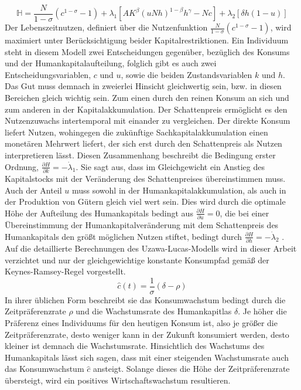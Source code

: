 \begin{equation}
\mathbb{H}=\frac{N}{1-\sigma}(c^{1-\sigma}-1)+\lambda_1[AK^\beta(uNh)^{1-\beta}h^\gamma-Nc]+\lambda_2[\delta h(1-u)]
\end{equation}
Der Lebenszeitnutzen, definiert {\"u}ber die Nutzenfunktion $\frac{N}{1-\sigma}(c^{1-\sigma}-1)$, wird maximiert unter Ber{\"u}cksichtigung beider Kapitalrestriktionen. \newline Ein Individuum steht in diesem Modell zwei Entscheidungen gegen{\"u}ber, bez{\"u}glich des Konsums und der Humankapitalaufteilung, folglich gibt es auch zwei Entscheidungsvariablen, $c$ und $u$, sowie die beiden Zustandsvariablen $k$ und $h$. \newline Das Gut muss demnach in zweierlei Hinsicht gleichwertig sein, bzw. in diesen Bereichen gleich wichtig sein. Zum einen durch den reinen Konsum an sich und zum anderen in der Kapitalakkumulation. Der Schattenpreis erm{\"o}glicht es den Nutzenzuwachs intertemporal mit einander zu vergleichen. Der direkte Konsum liefert Nutzen, wohingegen die zuk{\"u}nftige Sachkapitalakkumulation einen monet{\"a}ren Mehrwert liefert, der sich erst durch den Schattenpreis als Nutzen interpretieren l{\"a}sst.  Diesen Zusammenhang beschreibt die Bedingung erster Ordnung, $\frac{\partial H}{\partial k}=-\dot{\lambda}_1$. Sie sagt aus, dass im Gleichgewicht ein Anstieg des Kapitalstocks mit der Ver{\"a}nderung des Schattenpreises {\"u}bereinstimmen muss. \newline 
Auch der Anteil $u$ muss sowohl in der Humankapitalakkumulation, als auch in der Produktion von G{\"u}tern gleich viel wert sein. Dies wird durch die optimale H{\"o}he der Aufteilung des Humankapitals bedingt aus $\frac{\partial H}{\partial u}=0$, die bei einer {\"U}bereinstimmung der Humankapitalver{\"a}nderung mit dem Schattenpreis des Humankapitals den gr{\"o}{\ss}t m{\"o}glichen Nutzen stiftet, bedingt durch $\frac{\partial H}{\partial h}=-\dot{\lambda}_2$ \cite[S.~20--21]{Lucas.1988}.\\
Auf die detaillierte  Berechnungen des Uzawa-Lucas-Modells wird in dieser Arbeit verzichtet und nur der gleichgewichtige konstante Konsumpfad gem{\"a}{\ss} der Keynes-Ramsey-Regel vorgestellt.
\begin{equation}
\hat{c}(t)=\frac{1}{\sigma}(\delta-\rho)
\end{equation}
In ihrer {\"u}blichen Form beschreibt sie das Konsumwachstum bedingt durch die Zeitpr{\"a}ferenzrate $\rho$ und die Wachstumsrate des Humankapitlas $\delta$. Je h{\"o}her die Pr{\"a}ferenz eines Individuums f{\"u}r den heutigen Konsum ist, also je gr{\"o}{\ss}er die Zeitpr{\"a}ferenzrate, desto weniger kann in der Zukunft konsumiert werden, desto kleiner ist demnach die Wachstumsrate. Hinsichtlich des Wachstums des Humankapitals l{\"a}sst sich sagen, dass mit einer steigenden Wachstumsrate auch das Konsumwachstum $\hat{c}$ ansteigt. Solange dieses die H{\"o}he der Zeitpr{\"a}ferenzrate {\"u}bersteigt, wird ein positives Wirtschaftswachstum resultieren.\bigskip

